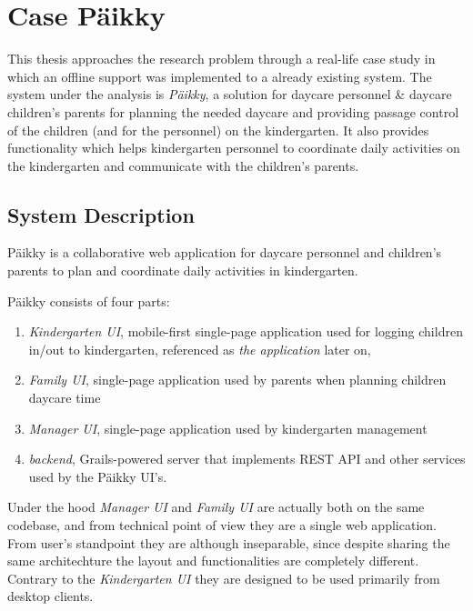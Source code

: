 
\chapter{Case Päikky}
This thesis approaches the research problem through a real-life case study in which an offline support was implemented to a already existing system. The system under the analysis is \textit{Päikky}, a solution for daycare personnel & daycare children’s parents for planning the needed daycare and providing passage control of the children (and for the personnel) on the kindergarten. It also provides functionality which helps kindergarten personnel to coordinate daily activities on the kindergarten and communicate with the children's parents.


\section{System Description}


Päikky is a collaborative web application for daycare personnel and children's parents to plan and coordinate daily activities in kindergarten. 

Päikky consists of four parts:

\begin{enumerate}
	\item \textit{Kindergarten UI}, mobile-first single-page application used for logging children in/out to kindergarten, referenced as \textit{the application} later on,
	\item \textit{Family UI}, single-page application used by parents when planning children daycare time
	\item \textit{Manager UI}, single-page application used by kindergarten management 
	\item \textit{backend}, Grails-powered server that implements REST API and other services used by the Päikky UI's.
\end{enumerate}

Under the hood \textit{Manager UI} and \textit{Family UI} are actually both on the same codebase, and from technical point of view they are a single web application. From user's standpoint they are although inseparable, since despite sharing the same architechture the layout and functionalities are completely different. Contrary to the \textit{Kindergarten UI} they are designed to be used primarily from desktop clients. 

